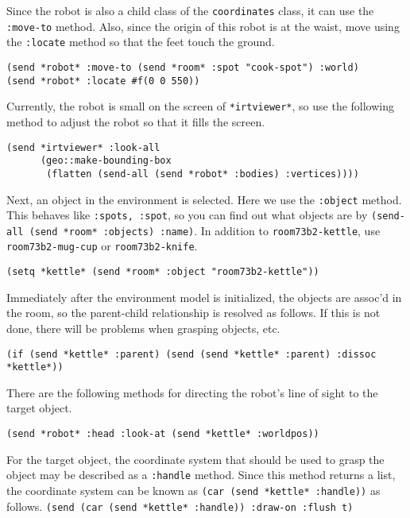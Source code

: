 Since the robot is also a child class of the \verb|coordinates| class, it can use the \verb|:move-to| method. Also, since the origin of this robot is at the waist, move using the \verb|:locate| method so that the feet touch the ground.
{\baselineskip=10pt
\begin{verbatim}
(send *robot* :move-to (send *room* :spot "cook-spot") :world)
(send *robot* :locate #f(0 0 550))
\end{verbatim}
}

Currently, the robot is small on the screen of \verb|*irtviewer*|, so use the following method to adjust the robot so that it fills the screen.
{\baselineskip=10pt
\begin{verbatim}
(send *irtviewer* :look-all
      (geo::make-bounding-box
       (flatten (send-all (send *robot* :bodies) :vertices))))
\end{verbatim}
}

Next, an object in the environment is selected. Here we use the \verb|:object| method.
This behaves like \verb|:spots, :spot|, so you can find out what objects are by \verb|(send-all (send *room* :objects) :name)|.
In addition to \verb|room73b2-kettle|, use \verb|room73b2-mug-cup| or \verb|room73b2-knife|.

{\baselineskip=10pt
\begin{verbatim}
(setq *kettle* (send *room* :object "room73b2-kettle"))
\end{verbatim}
}

Immediately after the environment model is initialized, the objects are assoc'd in the room, so the parent-child relationship is resolved as follows. If this is not done, there will be problems when grasping objects, etc.
{\baselineskip=10pt
\begin{verbatim}
(if (send *kettle* :parent) (send (send *kettle* :parent) :dissoc *kettle*))
\end{verbatim}
}

There are the following methods for directing the robot's line of sight to the target object.
{\baselineskip=10pt
\begin{verbatim}
(send *robot* :head :look-at (send *kettle* :worldpos))
\end{verbatim}
}

For the target object, the coordinate system that should be used to grasp the object may be described as a \verb|:handle| method. Since this method returns a list, the coordinate system can be known as \verb|(car (send *kettle* :handle))| as follows. \verb|(send (car (send *kettle* :handle)) :draw-on :flush t)|

